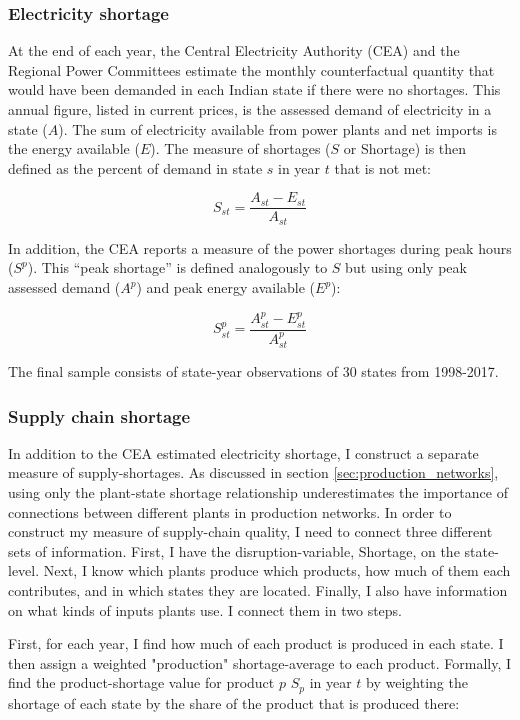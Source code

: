 \documentclass[11pt]{article}
\begin{document}
\subsubsection{Electricity shortage}%
\label{sub:shortage}

At the end of each year, the Central Electricity Authority (CEA) and the Regional Power Committees estimate the monthly counterfactual quantity that would have been demanded in each Indian state if there were no shortages. This annual figure, listed in current prices, is the assessed demand of electricity in a state (\(A\)). The sum of electricity available from power plants and net imports is the energy available ($E$). The measure of shortages (\(S\) or Shortage) is then defined as the percent of demand in state \(s\) in year \(t\) that is not met:

\[
S_{st} = \frac{A_{st} - E_{st} }{A_{st}}
\]

In addition, the CEA reports a measure of the power shortages during peak hours (\(S^p\)). This ``peak shortage'' is defined analogously to \(S\) but using only peak assessed demand (\(A^{p}\)) and peak energy available (\(E^p\)):

\[
S^{p}_{st} = \frac{A^{p}_{st} - E^{p}_{st}}{A^{p}_{st}}
\]

The final sample consists of state-year observations of 30 states from 1998-2017. 

\subsubsection{Supply chain shortage}%
\label{sub:supply_chain_quality}

In addition to the CEA estimated electricity shortage, I construct a separate measure of supply-shortages. As discussed in section \ref{sec:production_networks}, using only the plant-state shortage relationship underestimates the importance of connections between different plants in production networks. In order to construct my measure of supply-chain quality, I need to connect three different sets of information. First, I have the disruption-variable, Shortage, on the state-level. Next, I know which plants produce which products, how much of them each contributes, and in which states they are located. Finally, I also have information on what kinds of inputs plants use. I connect them in two steps.

First, for each year, I find how much of each product is produced in each state. I then assign a weighted "production" shortage-average to each product. Formally, I find the product-shortage value for product $p$ $S_{p}$ in year $t$ by weighting the shortage of each state by the share of the product that is produced there:
\end{document}

